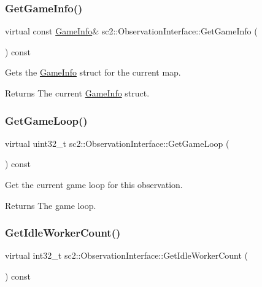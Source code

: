 \subsubsection{\texorpdfstring{Get\+Game\+Info()}{GetGameInfo()}}
{\footnotesize\ttfamily virtual const \hyperlink{structsc2_1_1_game_info}{Game\+Info}\& sc2\+::\+Observation\+Interface\+::\+Get\+Game\+Info (\begin{DoxyParamCaption}{ }\end{DoxyParamCaption}) const\hspace{0.3cm}{\ttfamily [pure virtual]}}

Gets the \hyperlink{structsc2_1_1_game_info}{Game\+Info} struct for the current map. \begin{DoxyReturn}{Returns}
The current \hyperlink{structsc2_1_1_game_info}{Game\+Info} struct. 
\end{DoxyReturn}
\mbox{\label{classsc2_1_1_observation_interface_a19d85546124654418d00b736f0146218}} 
\subsubsection{\texorpdfstring{Get\+Game\+Loop()}{GetGameLoop()}}
{\footnotesize\ttfamily virtual uint32\+\_\+t sc2\+::\+Observation\+Interface\+::\+Get\+Game\+Loop (\begin{DoxyParamCaption}{ }\end{DoxyParamCaption}) const\hspace{0.3cm}{\ttfamily [pure virtual]}}

Get the current game loop for this observation. \begin{DoxyReturn}{Returns}
The game loop. 
\end{DoxyReturn}
\mbox{\label{classsc2_1_1_observation_interface_aa02a57eddba0fca44df116439979f8b7}} 
\subsubsection{\texorpdfstring{Get\+Idle\+Worker\+Count()}{GetIdleWorkerCount()}}
{\footnotesize\ttfamily virtual int32\+\_\+t sc2\+::\+Observation\+Interface\+::\+Get\+Idle\+Worker\+Count (\begin{DoxyParamCaption}{ }\end{DoxyParamCaption}) const\hspace{0.3cm}{\ttfamily [pure virtual]}}

